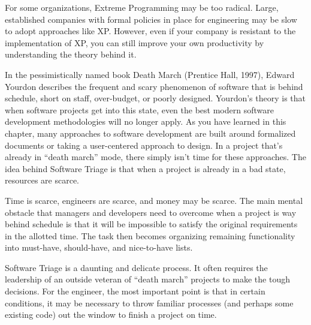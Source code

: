 For some organizations, Extreme Programming may be too radical. Large, established companies with formal policies in place for engineering may be slow to adopt approaches like XP. However, even if your company is resistant to the implementation of XP, you can still improve your own productivity by understanding the theory behind it.



In the pessimistically named book Death March (Prentice Hall, 1997), Edward Yourdon describes the frequent and scary phenomenon of software that is behind schedule, short on staff, over-budget, or poorly designed. Yourdon’s theory is that when software projects get into this state, even the best modern software development methodologies will no longer apply. As you have learned in this chapter, many approaches to software development are built around formalized documents or taking a user-centered approach to design. In a project that’s already in “death march” mode, there simply isn’t time for these approaches.
The idea behind Software Triage is that when a project is already in a bad state, resources are scarce.

Time is scarce, engineers are scarce, and money may be scarce. The main mental obstacle that managers and developers need to overcome when a project is way behind schedule is that it will be impossible to satisfy the original requirements in the allotted time. The task then becomes organizing remaining functionality into must-have, should-have, and nice-to-have lists.

Software Triage is a daunting and delicate process. It often requires the leadership of an outside veteran of “death march” projects to make the tough decisions. For the engineer, the most important point is that in certain conditions, it may be necessary to throw familiar processes (and perhaps some existing code) out the window to finish a project on time.